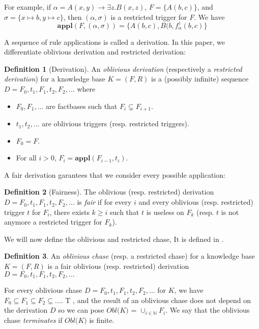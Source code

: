 \documentclass{article}
\theoremstyle{definition}
\newtheorem{definition}{Definition}[section]
\theoremstyle{remark}
\def \N {\mathbb N}
\newcommand{\Appl}{\textbf{appl}}
\begin{document}
For example, if $\alpha = A(x,y) \rightarrow \exists z.B(x,z)$, $F = \{A(b,c)\}$, and $\sigma = \{x \mapsto b, y \mapsto c \}$, then $(\alpha,\sigma)$ is a restricted trigger for $F$. We have $$\Appl(F,(\alpha,\sigma)) = \{A(b,c),B(b,f_{\alpha}^z(b,c)\}$$

A sequence of rule applications is called a derivation. In this paper, we differentiate oblivious derivation and restricted derivation:

\begin{definition}[Derivation]
An \emph{oblivious derivation} (respectively a \emph{restricted derivation}) for a knowledge base $K= (F,R)$ is a (possibly infinite) sequence $D=F_0,t_1,F_1,t_2,F_2,\ldots$ where 
\begin{itemize}
\item $F_0,F_1,\ldots$ are factbases such that $F_i \subsetneq F_{i+1}$.
\item $t_1,t_2,\ldots$ are oblivious triggers (resp. restricted triggers).
\item $F_0 = F$.
\item For all $i > 0$, $F_{i}= \Appl(F_{i-1},t_i)$.
\end{itemize}
\end{definition}

A fair derivation garantees that we consider every possible application:

\begin{definition}[Fairness]
The oblivious (resp. restricted) derivation $D=F_0,t_1,F_1,t_2,F_2,\ldots$ is \emph{fair} if for every $i$ and every oblivious (resp. restricted) trigger $t$ for $F_i$, there exists $k \geq i$ such that $t$ is useless on $F_k$ (resp. $t$ is not anymore a restricted trigger for $F_k$).
\end{definition}

We will now define the oblivious and restricted chase, It is defined in \cite{obl_res}.


\begin{definition}
An \emph{oblivious chase} (resp. a restricted chase) for a knowledge base $K= (F,R)$ is a fair oblivious (resp. restricted) derivation $D=F_0,t_1,F_1,t_2,F_2,\ldots$ 
\end{definition}

For every oblivious chase $D = F_0,t_1,F_1,t_2,F_2,\ldots$ for $K$, we have $F_0 \subseteq F_1 \subseteq F_2 \subseteq \ldots$. T
, and the result of an oblivious chase does not depend on the derivation $D$ so we can pose \emph{$\textit{Obl(K)}$} = $\cup_{i \in \N}F_i$. We say that the oblivious chase \emph{terminates} if $\textit{Obl(K)}$ is finite.
\end{document}
